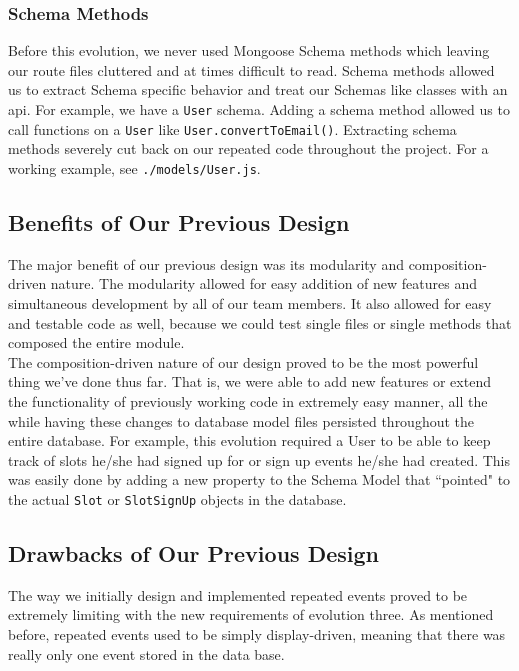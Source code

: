 \documentclass[11pt]{article}   %
\begin{document}
\subsubsection{Schema Methods}
Before this evolution, we never used Mongoose Schema methods which leaving our route files cluttered and at times difficult to read. Schema methods allowed us to extract Schema specific behavior and treat our Schemas like classes with an api. For example, we have a \texttt{User} schema. Adding a schema method allowed us to call functions on a \texttt{User} like \texttt{User.convertToEmail()}. Extracting schema methods severely cut back on our repeated code throughout the project. For a working example, see \texttt{./models/User.js}.

\subsection{Benefits of Our Previous Design}
The major benefit of our previous design was its modularity and composition-driven nature. The modularity allowed for easy addition of new features and simultaneous development by all of our team members. It also allowed for easy and testable code as well, because we could test single files or single methods that composed the entire module.\\

\noindent The composition-driven nature of our design proved to be the most powerful thing we've done thus far. That is, we were able to add new features or extend the functionality of previously working code in extremely easy manner, all the while having these changes to database model files persisted throughout the entire database. For example, this evolution required a User to be able to keep track of slots he/she had signed up for or sign up events he/she had created. This was easily done by adding a new property to the Schema Model that ``pointed" to the actual \texttt{Slot} or \texttt{SlotSignUp} objects in the database.

\subsection{Drawbacks of Our Previous Design}
The way we initially design and implemented repeated events proved to be extremely limiting with the new requirements of evolution three. As mentioned before, repeated events used to be simply display-driven, meaning that there was really only one event stored in the data base.\\
\end{document}
